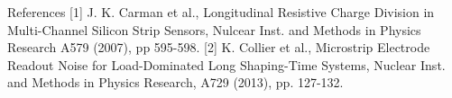 References
[1] J. K. Carman et al., Longitudinal Resistive Charge Division in Multi-Channel Silicon Strip Sensors, Nulcear Inst. and Methods in Physics Research A579 (2007), pp 595-598.
[2] K. Collier et al., Microstrip Electrode Readout Noise for Load-Dominated Long Shaping-Time Systems, Nuclear Inst. and Methods in Physics Research, A729 (2013), pp. 127-132.
